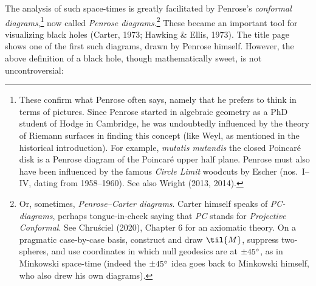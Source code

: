 \documentclass[11pt,a4paper]{article}
\begin{document}
The analysis of such space-times is greatly facilitated by Penrose's \emph{conformal diagrams},\footnote{
 These confirm what Penrose often says, namely that he prefers to think in terms of pictures.
Since Penrose started  in algebraic geometry as a PhD student of Hodge in Cambridge, he was undoubtedly influenced by the theory of Riemann surfaces in finding this concept (like Weyl, as mentioned in the historical introduction). For example, \emph{mutatis mutandis} the closed Poincar\'{e} disk is a Penrose diagram of
the Poincar\'{e} upper half plane. Penrose must also have been influenced by the famous \emph{Circle Limit} woodcuts by Escher (nos.\ I--IV, dating from 1958--1960). See also Wright (2013, 2014). 
} now  called  
\emph{Penrose diagrams}.\footnote{Or, sometimes,  \emph{Penrose--Carter diagrams}. Carter himself speaks of \emph{PC-diagrams}, perhaps tongue-in-cheek saying that \emph{PC} stands for \emph{Projective Conformal}. See  Chru\'{s}ciel (2020), Chapter 6 for an axiomatic theory. On a pragmatic case-by-case basis, construct and draw  $\til{M}$,
 suppress two-spheres, and use coordinates in which null geodesics are at $\pm 45\degree$, as in Minkowski space-time (indeed the  $\pm 45\degree$ idea goes back to Minkowski himself, who also drew his own diagrams). 
}
These became an important tool for visualizing black holes (Carter, 1973; Hawking \& Ellis, 1973). The title page shows one of the first such diagrams, drawn by Penrose himself.
 \newpage
 However, the above definition of a black hole, though mathematically sweet, is not uncontroversial:
\end{document}
